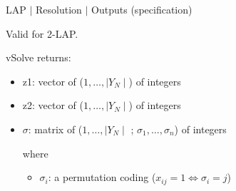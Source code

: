 %
% 
\begin{frame}{LAP $\mid$ Resolution $\mid$ Outputs (specification)}

Valid for 2-LAP.
\bigskip

vSolve returns:
\medskip
                           \begin{itemize}
                              \item z1: vector of ($1, \dots, \mid Y_N \mid $) of integers
                              \item z2: vector of ($1,\dots, \mid Y_N \mid $) of integers
                              \item $\sigma$: matrix of ($1,\dots, \mid Y_N \mid $ ; $\sigma_1, \dots, \sigma_n$) of integers
                                                                                         
                              where
                               \begin{itemize}
                                     \item $\sigma_i$:  a permutation coding ($x_{ij}=1 \Leftrightarrow \sigma_i=j$)
                                \end{itemize}
                           \end{itemize}               

\end{frame}

%
% 
